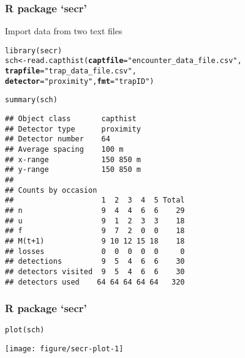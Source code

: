 \documentclass[color=usenames,dvipsnames]{beamer}\usepackage[]{graphicx}\usepackage[]{xcolor}
\makeatletter
\newcommand{\hlsng}[1]{\textcolor[rgb]{0.749,0.012,0.012}{#1}}%
\newcommand{\hldef}[1]{\textcolor[rgb]{0,0,0}{#1}}%
\newcommand{\hlkwb}[1]{\textcolor[rgb]{0,0.341,0.682}{#1}}%
\newcommand{\hlkwc}[1]{\textcolor[rgb]{0,0,0}{\textbf{#1}}}%
\newcommand{\hlkwd}[1]{\textcolor[rgb]{0.004,0.004,0.506}{#1}}%
\newenvironment{kframe}{%
 \def\at@end@of@kframe{}%
 \ifinner\ifhmode%
  \def\at@end@of@kframe{\end{minipage}}%
  \begin{minipage}{\columnwidth}%
 \fi\fi%
 \def\FrameCommand##1{\hskip\@totalleftmargin \hskip-\fboxsep
 \colorbox{shadecolor}{##1}\hskip-\fboxsep
     \hskip-\linewidth \hskip-\@totalleftmargin \hskip\columnwidth}%
 \MakeFramed {\advance\hsize-\width
   \@totalleftmargin\z@ \linewidth\hsize
   \@setminipage}}%
 {\par\unskip\endMakeFramed%
 \at@end@of@kframe}
\newenvironment{knitrout}{}{} %
\makeatother
\begin{document}
\begin{frame}[fragile]
  \frametitle{R package `secr'}
  Import data from two text files
\begin{knitrout}\tiny
{}\color{fgcolor}\begin{kframe}
\begin{alltt}
\hlkwd{library}\hldef{(secr)}
\hldef{sch} \hlkwb{<-} \hlkwd{read.capthist}\hldef{(}\hlkwc{captfile}\hldef{=}\hlsng{"encounter_data_file.csv"}\hldef{,}
                     \hlkwc{trapfile}\hldef{=}\hlsng{"trap_data_file.csv"}\hldef{,}
                     \hlkwc{detector}\hldef{=}\hlsng{"proximity"}\hldef{,} \hlkwc{fmt}\hldef{=}\hlsng{"trapID"}\hldef{)}
\end{alltt}


{\ttfamily\noindent\itshape\color{messagecolor}{\#\# No errors found :-)}}\begin{alltt}
\hlkwd{summary}\hldef{(sch)}
\end{alltt}
\begin{verbatim}
## Object class       capthist 
## Detector type      proximity 
## Detector number    64 
## Average spacing    100 m 
## x-range            150 850 m 
## y-range            150 850 m 
## 
## Counts by occasion 
##                    1  2  3  4  5 Total
## n                  9  4  4  6  6    29
## u                  9  1  2  3  3    18
## f                  9  7  2  0  0    18
## M(t+1)             9 10 12 15 18    18
## losses             0  0  0  0  0     0
## detections         9  5  4  6  6    30
## detectors visited  9  5  4  6  6    30
## detectors used    64 64 64 64 64   320
\end{verbatim}
\end{kframe}
\end{knitrout}
\end{frame}



\begin{frame}[fragile]
  \frametitle{R package `secr'}
\begin{knitrout}
\color{fgcolor}\begin{kframe}
\begin{alltt}
\hlkwd{plot}\hldef{(sch)}
\end{alltt}
\end{kframe}

{\centering \texttt{[image: figure/secr-plot-1]} 

}


\end{knitrout}
\end{frame}
\end{document}
